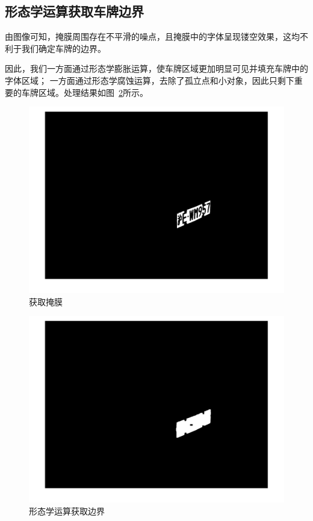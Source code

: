 \documentclass[utf8,a4paper]{ctexart}
\begin{document}
\subsection{形态学运算获取车牌边界}
由图像可知，掩膜周围存在不平滑的噪点，且掩膜中的字体呈现镂空效果，这均不利于我们确定车牌的边界。

因此，我们一方面通过形态学膨胀运算，使车牌区域更加明显可见并填充车牌中的字体区域；
一方面通过形态学腐蚀运算，去除了孤立点和小对象，因此只剩下重要的车牌区域。处理结果如图~\ref{fig:morphology}所示。

\begin{minipage}{0.44\linewidth}
    \begin{figure}[H]
        \center
        \includegraphics[width=\linewidth]{./img/difficult/掩膜.png}
        \caption{获取掩膜}
        \label{fig:mask}
    \end{figure}
\end{minipage}
\hfill
\begin{minipage}{0.44\linewidth}
    \begin{figure}[H]
        \center
        \includegraphics[width=\linewidth]{./img/difficult/形态学运算.png}
        \caption{形态学运算获取边界}
        \label{fig:morphology}
    \end{figure}
\end{minipage}
\par
\end{document}
